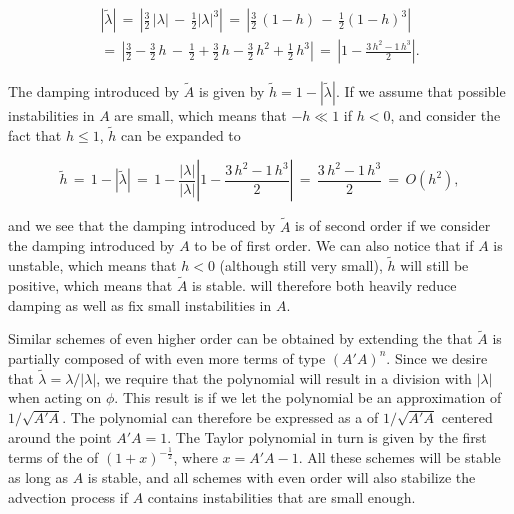 \begin{equation}
\begin{array}{c}
|\tilde{\lambda}| \,=\, \left|\tfrac{3}{2}\,|\lambda| \,-\, \tfrac{1}{2}|\lambda|^3\right| \,=\, \left|\tfrac{3}{2}\,(1-h) \,-\, \tfrac{1}{2}(1-h)^3\right| \\
=\, \left|\tfrac{3}{2}-\tfrac{3}{2}\,h \,-\, \tfrac{1}{2} + \tfrac{3}{2}\,h - \tfrac{3}{2}\,h^2 + \tfrac{1}{2}\,h^3\right| \,=\, \left|1 - \displaystyle\frac{3\,h^2 - 1\,h^3}{2}\right|.
\end{array}
\end{equation}

The damping introduced by $\tilde{A}$ is given by $\tilde{h} = 1 - |\tilde{\lambda}|$. If we assume that possible instabilities in $A$ are small, which means that $-h \ll 1$ if $h < 0$, and consider the fact that $h \leq 1$, $\tilde{h}$ can be expanded to

\begin{equation}
\tilde{h} \,=\, 1 - |\tilde{\lambda}| \,=\, 1 - \frac{|\lambda|}{|\lambda|}\left|1 - \displaystyle\frac{3\,h^2 - 1\,h^3}{2}\right| \,=\, \displaystyle\frac{3\,h^2 - 1\,h^3}{2} \,=\, O(h^2),
\end{equation}

and we see that the damping introduced by $\tilde{A}$ is of second order if we consider the damping introduced by $A$ to be of first order. We can also notice that if $A$ is unstable, which means that $h < 0$ (although still very small), $\tilde{h}$ will still be positive, which means that $\tilde{A}$ is stable. \BFECC will therefore both heavily reduce damping as well as fix small instabilities in $A$.

Similar schemes of even higher order can be obtained by extending the \polynomial that $\tilde{A}$ is partially composed of with even more terms of type $(A'A)^n$. Since we desire that $\tilde{\lambda} = \lambda/|\lambda|$, we require that the polynomial will result in a division with $|\lambda|$ when acting on $\phi$. This result is \approximated if we let the polynomial be an approximation of $1/\sqrt{A'A}$. The polynomial can therefore be expressed as a  of $1/\sqrt{A'A}$ centered around the point $A'A = 1$. The Taylor polynomial in turn is given by the first terms of the  of $(1+x)^{-\frac{1}{2}}$, where $x = A'A - 1$. All these schemes will be stable as long as $A$ is stable, and all schemes with even order will also stabilize the advection process if $A$ contains instabilities that are small enough.

